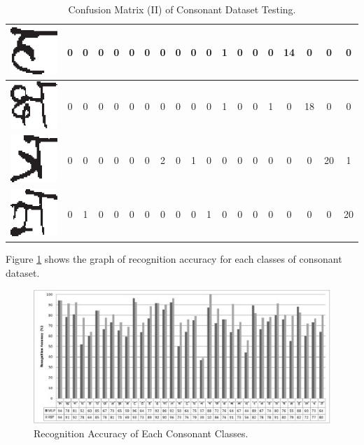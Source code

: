 \begin{table}[h]
\begin{tabular}{|c|c|c|c|c|c|c|c|c|c|c|c|c|c|c|c|c|c|c|}
\hline
\includegraphics[scale=0.25]{figures/datasets/nhcr/consonants/33ha} & 0 & 0 & 0 & 0 & 0 & 0 & 0 & 0 & 0 & 0 & 1 & 0 & 0 & 0 & 14 & 0 & 0 & 0\tabularnewline
\hline
\includegraphics[scale=0.25]{figures/datasets/nhcr/consonants/34kchya} & 0 & 0 & 0 & 0 & 0 & 0 & 0 & 0 & 0 & 0 & 1 & 0 & 0 & 1 & 0 & 18 & 0 & 0\tabularnewline
\hline
\includegraphics[scale=0.25]{figures/datasets/nhcr/consonants/35tra} & 0 & 0 & 0 & 0 & 0 & 0 & 2 & 0 & 1 & 0 & 0 & 0 & 0 & 0 & 0 & 0 & 20 & 1\tabularnewline
\hline
\includegraphics[scale=0.25]{figures/datasets/nhcr/consonants/36gya} & 0 & 1 & 0 & 0 & 0 & 0 & 0 & 0 & 0 & 1 & 0 & 0 & 0 & 0 & 0 & 0 & 0 & 20\tabularnewline
\hline
\end{tabular}
\caption{Confusion Matrix (II) of Consonant Dataset Testing.}
\label{table_consonant_cm2}
\end{table}

Figure \ref{figure_recognition_accuracy_consonants} shows the graph of recognition accuracy for each classes of consonant dataset.
\begin{figure}[h]
\centering
\includegraphics[scale=0.60]{figures/experiments/recognition_accuracy_consonants11.eps}
\caption{Recognition Accuracy of Each Consonant Classes.}
\label{figure_recognition_accuracy_consonants}
\end{figure}


